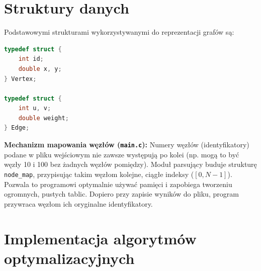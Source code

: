 \documentclass[12pt,a4paper]{article}
\begin{document}
\section{Struktury danych}
Podstawowymi strukturami wykorzystywanymi do reprezentacji grafów są:

\begin{lstlisting}[language=C]
typedef struct { 
    int id; 
    double x, y; 
} Vertex;

typedef struct { 
    int u, v; 
    double weight; 
} Edge;
\end{lstlisting}

\textbf{Mechanizm mapowania węzłów (\texttt{main.c}):} Numery węzłów (identyfikatory) podane w pliku wejściowym nie zawsze występują po kolei (np. mogą to być węzły 10 i 100 bez żadnych węzłów pomiędzy). Moduł parsujący buduje strukturę \texttt{node\_map}, przypisując takim węzłom kolejne, ciągłe indeksy ($[0, N-1]$). Pozwala to programowi optymalnie używać pamięci i zapobiega tworzeniu ogromnych, pustych tablic. Dopiero przy zapisie wyników do pliku, program przywraca węzłom ich oryginalne identyfikatory.

\section{Implementacja algorytmów optymalizacyjnych}
\end{document}
